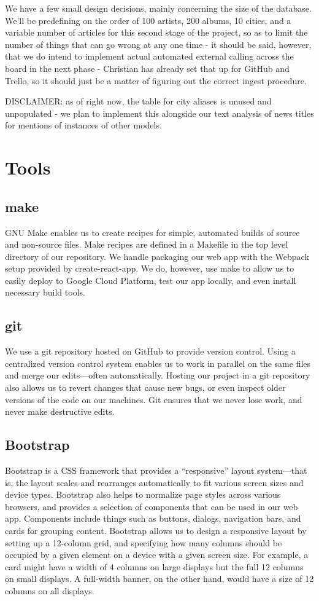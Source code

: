 \documentclass{scrartcl}
\begin{document}
We have a few small design decisions, mainly concerning the size of the database. We'll be predefining on the order of 100 artists, 200 albums, 10 cities, and a variable number of articles for this second stage of the project, so as to limit the number of things that can go wrong at any one time - it should be said, however, that we do intend to implement actual automated external calling across the board in the next phase - Christian has already set that up for GitHub and Trello, so it should just be a matter of figuring out the correct ingest procedure.

DISCLAIMER: as of right now, the table for city aliases is unused and unpopulated - we plan to implement this alongside our text analysis of news titles for mentions of instances of other models.

\section{Tools}

\subsection{make}
GNU Make enables us to create recipes for simple, automated builds of source and non-source files. Make recipes are defined in a Makefile in the top level directory of our repository. We handle packaging our web app with the Webpack setup provided by create-react-app. We do, however, use make to allow us to easily deploy to Google Cloud Platform, test our app locally, and even install necessary build tools.

\subsection{git}
We use a git repository hosted on GitHub to provide version control. Using a centralized version control system enables us to work in parallel on the same files and merge our edits—often automatically. Hosting our project in a git repository also allows us to revert changes that cause new bugs, or even inspect older versions of the code on our machines. Git ensures that we never lose work, and never make destructive edits.

\subsection{Bootstrap}
Bootstrap is a CSS framework that provides a “responsive” layout system—that is, the layout scales and rearranges automatically to fit various screen sizes and device types. Bootstrap also helps to normalize page styles across various browsers, and provides a selection of components that can be used in our web app. Components include things such as buttons, dialogs, navigation bars, and cards for grouping content. Bootstrap allows us to design a responsive layout by setting up a 12-column grid, and specifying how many columns should be occupied by a given element on a device with a given screen size. For example, a card might have a width of 4 columns on large displays but the full 12 columns on small displays. A full-width banner, on the other hand, would have a size of 12 columns on all displays.
\end{document}
